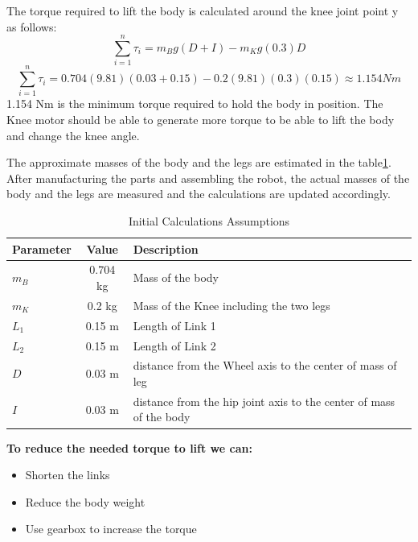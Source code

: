 The torque required to lift the body is calculated around the knee joint point y as follows:
\begin{equation}
	\sum_{i=1}^{n} \tau_{i}=m_{B}g(D+I)-m_{K}g(0.3)D
\end{equation}
\begin{equation}
	\sum_{i=1}^{n} \tau_{i}=0.704(9.81)(0.03+0.15)-0.2(9.81)(0.3)(0.15) \approx 1.154 Nm
\end{equation}
1.154 Nm is the minimum torque required to hold the body in position.
The Knee motor should be able to generate more torque to be able to lift the body and change the knee angle.
\vspace{2cm}

The approximate masses of the body and the legs are estimated in the table\ref{tab:initialcalculationsassumptions}.
After manufacturing the parts and assembling the robot, the actual masses of the body and the legs are measured and the calculations are updated accordingly.
\begin{table}[h]
	\centering
	\caption{Initial Calculations Assumptions}
	\label{tab:initialcalculationsassumptions}
	\begin{tabular}{lcl}
		\toprule
		Parameter & Value & Description 			  \\
		\midrule
		$m_B$         & 0.704 kg  & Mass of the body  \\
		$m_K$         & 0.2 kg  & Mass of the Knee including the two legs\\
		$L_1$         & 0.15 m   & Length of Link 1  \\
		$L_2$         & 0.15 m   & Length of Link 2   \\
		$D$ 	  	  & 0.03 m   & distance from the Wheel axis to the center of mass of leg \\
		$I$ 	  	  & 0.03 m   & distance from the hip joint axis to the center of mass of the body   \\
		\bottomrule
	\end{tabular}
\end{table}

\begin{notebox}
	\textbf{To reduce the needed torque to lift we can:}
	\begin{itemize}
		\item Shorten the links
		\item Reduce the body weight
		\item Use gearbox to increase the torque
	\end{itemize}
\end{notebox}
\newpage
